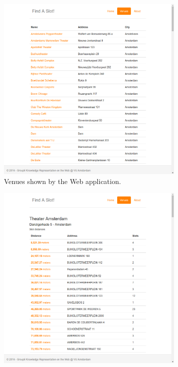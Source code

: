 \documentclass[runningheads,a4paper]{../../StyleFiles/llncs}
\begin{document}



\begin{figure}
	\centering
	\begin{subfigure}[b]{.4\textwidth}
		\includegraphics[width=\textwidth]{img/app-venues.png}
		\caption{Venues shown by the Web application.}
		\label{fig:app-venues}
	\end{subfigure}
	\qquad
	\begin{subfigure}[b]{.4\textwidth}
		\includegraphics[width=\textwidth]{img/app-slots.png}

\end{subfigure}
\end{figure}
\end{document}
